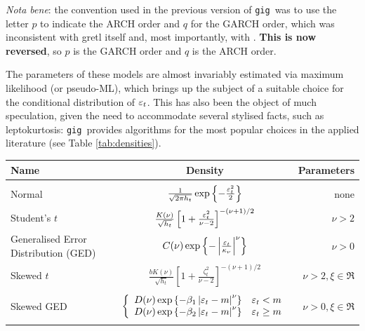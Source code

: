 \documentclass[a4paper,11pt]{article}
\newcommand{\app}[1]{\textsf{#1}}
\newcommand{\tip}[1]{\par\vspace{4pt}
 \ding{43} {\small \sffamily #1}\par\smallskip}
\newcommand{\stdu}{\ensuremath \varepsilon}
\newcommand{\gig}{\texttt{gig}}
\begin{document}
\tip{\emph{Nota bene}: the convention used in the previous version of \gig\
was to use the letter $p$ to indicate the ARCH order and $q$ for the
GARCH order, which was inconsistent with \app{gretl} itself and, most
importantly, with \cite{Bollerslev-86}. \textbf{This is now reversed},
so $p$ is the GARCH order and $q$ is the ARCH order.}


The parameters of these models are almost invariably estimated via
maximum likelihood (or pseudo-ML), which brings up the subject of a
suitable choice for the conditional distribution of $\stdu_t$.  This has
also been the object of much speculation, given the need to
accommodate several stylised facts, such as leptokurtosis:
\gig\ provides algorithms for the most popular choices in the
applied literature (see Table \ref{tab:densities}).

\begin{table}[hptb]
  \centering
  \begin{footnotesize}
  \begin{tabular}{p{}cr}
    \hline 
    \textbf{Name} &  \textbf{Density}  &  \textbf{Parameters} \\
    \hline 
    \\
    Normal & 
    $\frac{1}{\sqrt{2\pi h_t}} 
    \exp \left\{-\frac{\stdu_t^2}{2}\right\}$ & 
    none \\
    Student's $t$ & 
    $\frac{K(\nu)}{\sqrt{h_t}}
    \left[1+\frac{\stdu_t^2}{\nu-2}\right]^{-(\nu + 1)/2}$ &
    $\nu > 2$ \\
    Generalised Error Distribution (GED) &
    $C(\nu)\exp\left\{-\left|\frac{\stdu_t}{\kappa_\nu}\right|^\nu\right\}$
    & $\nu > 0$ \\
    Skewed $t$ & 
    $\frac{b K(\nu)}{\sqrt{h_t}}
    \left[1 + \frac{\zeta_t^2}{\nu - 2}\right]^{-(\nu + 1)/2}$ 
    & $\nu > 2, \xi \in \Re$ \\
    \\
    Skewed GED &
    $\left\{
      \begin{array}{cc}
        D(\nu) \exp\left\{-\beta_1 \left|\stdu_t - m\right|^\nu\right\} &
          \stdu_t < m \\
        D(\nu) \exp\left\{-\beta_2 \left|\stdu_t - m\right|^\nu\right\} &
          \stdu_t \ge m 
      \end{array}
    \right.$
    & $\nu > 0, \xi \in \Re$ \\
    \\
    \hline
    \hline
  \end{tabular}
  \end{footnotesize}


\end{table}
\end{document}
